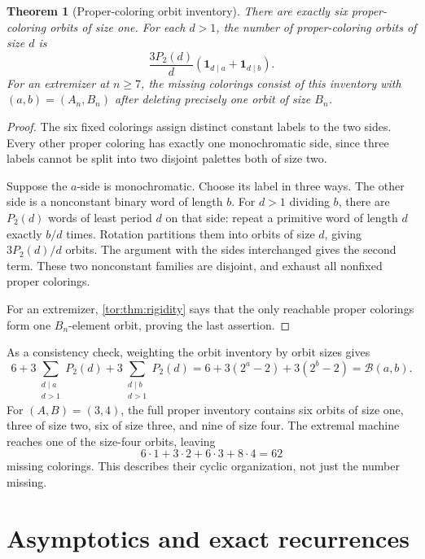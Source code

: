\documentclass[11pt,a4paper]{article}
\numberwithin{equation}{section}
\newtheorem{theorem}{Theorem}[section]
\theoremstyle{definition}
\theoremstyle{remark}
\newcommand{\Bip}{\mathcal B}
\newcommand{\bbone}{\mathbf 1}
\begin{document}
\begin{theorem}[Proper-coloring orbit inventory]\label{tor:thm:inventory}
There are exactly six proper-coloring orbits of size one. For each $d>1$, the
number of proper-coloring orbits of size $d$ is
\begin{equation}\label{tor:eq:inventory}
 \frac{3P_2(d)}d
 \left(\bbone_{d\mid a}+\bbone_{d\mid b}\right).
\end{equation}
For an extremizer at $n\ge7$, the missing colorings consist of this inventory
with $(a,b)=(A_n,B_n)$ after deleting precisely one orbit of size $B_n$.
\end{theorem}
\begin{proof}
The six fixed colorings assign distinct constant labels to the two sides.
Every other proper coloring has exactly one monochromatic side, since three
labels cannot be split into two disjoint palettes both of size two.

Suppose the $a$-side is monochromatic. Choose its label in three ways. The
other side is a nonconstant binary word of length $b$. For $d>1$ dividing $b$,
there are $P_2(d)$ words of least period $d$ on that side: repeat a primitive
word of length $d$ exactly $b/d$ times. Rotation partitions them into orbits of
size $d$, giving $3P_2(d)/d$ orbits. The argument with the sides interchanged
gives the second term. These two nonconstant families are disjoint, and
exhaust all nonfixed proper colorings.

For an extremizer, \cref{tor:thm:rigidity} says that the only reachable proper
colorings form one $B_n$-element orbit, proving the last assertion.
\end{proof}

As a consistency check, weighting the orbit inventory by orbit sizes gives
\[
 6+3\sum_{\substack{d\mid a\\d>1}}P_2(d)
  +3\sum_{\substack{d\mid b\\d>1}}P_2(d)
 =6+3(2^a-2)+3(2^b-2)=\Bip(a,b).
\]
For $(A,B)=(3,4)$, the full proper inventory contains six orbits of size one,
three of size two, six of size three, and nine of size four. The extremal
machine reaches one of the size-four orbits, leaving
\[
 6\cdot1+3\cdot2+6\cdot3+8\cdot4=62
\]
missing colorings. This describes their cyclic organization, not just the
number missing.

\section{Asymptotics and exact recurrences}\label{tor:sec:asymptotics}
\end{document}
